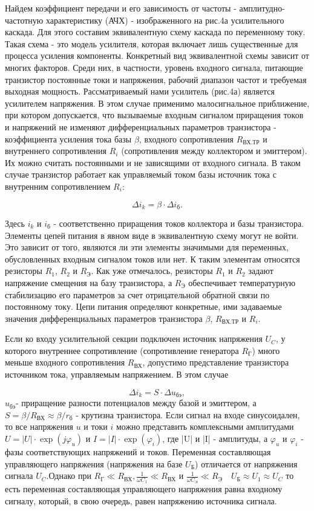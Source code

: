 Найдем коэффициент передачи и его зависимость от частоты - амплитудно-частотную характеристику (АЧХ) - изображенного на рис.4а усилительного каскада. Для этого составим эквивалентную схему каскада по переменному току. Такая схема - это модель усилителя, которая включает лишь существенные для процесса усиления компоненты. Конкретный вид эквивалентной схемы зависит от многих факторов. Среди них, в частности, уровень входного сигнала, питающие транзистор постоянные токи и
напряжения, рабочий диапазон частот и требуемая выходная мощность. Рассматриваемый нами усилитель (рис.4а) является усилителем напряжения. В этом случае применимо малосигнальное приближение, при котором допускается, что вызываемые входным
сигналом приращения токов и напряжений не изменяют дифференциальных параметров транзистора - коэффициента усиления тока базы $\beta$, входного сопротивления $R_{\text{ВХ.ТР}}$ и внутреннего сопротивления $R_i$ (сопротивления между коллектором и эмиттером). Их можно считать постоянными и не зависящими от входного сигнала. В таком случае транзистор работает как управляемый током базы источник тока с внутренним сопротивлением $R_i$:

$$\Delta i_k = \beta \cdot \Delta i_{\text{б}}.$$

Здесь $i_k$ и $i_{\text{б}}$ - соответственно приращения токов коллектора и базы транзистора. Элементы цепей питания в явном виде в эквивалентную схему могут не войти. Это зависит от того, являются ли эти элементы значимыми для переменных, обусловленных входным сигналом токов или нет. К таким элементам относятся резисторы $R_1$, $R_2$ и $R_{\text{Э}}$. Как уже отмечалось, резисторы $R_1$ и $R_2$ задают напряжение смещения на базу транзистора, а $R_{\text{Э}}$ обеспечивает температурную стабилизацию его параметров за счет отрицательной обратной связи по постоянному току. Цепи питания определяют конкретные, ими задаваемые значения дифференциальных параметров транзистора $\beta$, $R_{\text{ВХ.ТР}}$ и $R_i$.

Если ко входу усилительной секции подключен источник напряжения $U_C$, у которого внутреннее сопротивление (сопротивление генератора $R_{\text{Г}}$) много меньше входного сопротивления $R_{\text{ВХ}}$, допустимо представление транзистора источником тока, управляемым напряжением. В этом случае

$$\Delta i_k = S\cdot \Delta u_{\text{бэ}},$$
$u_{\text{бэ}}$- приращение разности потенциалов между базой и эмиттером, а $S=\beta/R_{\text{ВХ}} \approx \beta/r_{\text{б}}$ - крутизна транзистора. Если сигнал на входе
синусоидален, то все напряжения $u$ и токи $i$ можно представить
комплексными амплитудами $U=|U|\cdot \exp(j\varphi_u)$ и $I=|I|\cdot \exp(\varphi_i)$, где |U| и |I| - амплитуды, а $\varphi_u$ и $\varphi_i$ - фазы соответствующих напряжений и токов. Переменная составляющая управляющего напряжения (напряжения на базе $U_{\text{Б}}$) отличается от напряжения сигнала $U_C$.Однако при $R_{\text{Г}}\ll R_{\text{ВХ}},\frac{1}{\omega C_1}\ll R_{\text{ВХ}}$ и $\frac{1}{\omega C_{\text{Э}}}\ll R_{\text{Э}}$~~$U_{\text{Б}} \approx U_1 \approx U_C$ то есть переменная составляющая управляющего напряжения равна входному сигналу, который, в свою очередь, равен напряжению источника сигнала.

